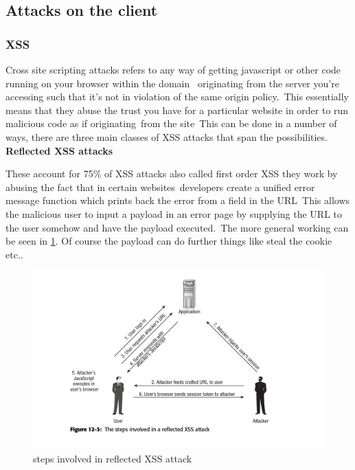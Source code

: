 \documentclass[a4paper,12pt]{paper}
\begin{document}
\subsection{Attacks on the client}

\subsubsection{XSS}


Cross site scripting attacks refers to any way of getting javascript or other code running on your browser within the domain \
originating from the server you're accessing such that it's not in violation of the same origin policy.\
This essentially means that they abuse the trust you have for a particular website in order to run malicious code as if originating\
from the site\
This can be done in a number of ways, there are three main classes of XSS attacks that span the possibilities.\\

\textbf{Reflected XSS attacks}

These account for 75\% of XSS attacks also called first order XSS they work by abusing the fact that in certain websites\
developers create a unified error message function which prints back the error from a field in the URL\
This allows the malicious user to input a payload in an error page by supplying the URL to the user somehow and have the payload executed.\
The more general working can be seen in \ref{fig:xssref}. Of course the payload can do further things like steal the cookie etc..\

\begin{figure}
\centering
\includegraphics[width=1\textwidth]{refl-XSS.png}
\caption{\label{fig:xssref}steps involved in reflected XSS attack}
\end{figure}
\end{document}
